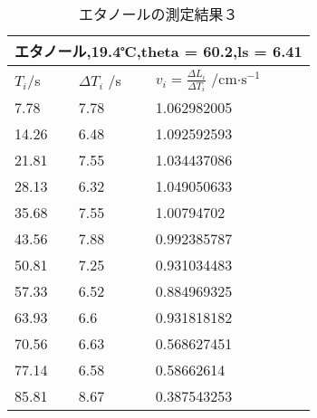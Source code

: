 \documentclass{jsarticle}
\begin{document}
\begin{table}[H]
\centering
\caption{エタノールの測定結果３}
\label{my-label}
\begin{tabular}{|l|l|l|}
\hline
\multicolumn{3}{|l|}{エタノール,19.4℃,theta = 60.2,ls = 6.41} \\ \hline
$T_i $/s   & $\Delta T_i $ /s  & $v_i = \frac{\Delta L_i}{\Delta T_i}$ /cm$\cdot \textrm{s}^{-1}$   \\ \hline
7.78            & 7.78           & 1.062982005           \\ \hline
14.26           & 6.48           & 1.092592593           \\ \hline
21.81           & 7.55           & 1.034437086           \\ \hline
28.13           & 6.32           & 1.049050633           \\ \hline
35.68           & 7.55           & 1.00794702            \\ \hline
43.56           & 7.88           & 0.992385787           \\ \hline
50.81           & 7.25           & 0.931034483           \\ \hline
57.33           & 6.52           & 0.884969325           \\ \hline
63.93           & 6.6            & 0.931818182           \\ \hline
70.56           & 6.63           & 0.568627451           \\ \hline
77.14           & 6.58           & 0.58662614            \\ \hline
85.81           & 8.67           & 0.387543253           \\ \hline
\end{tabular}
\end{table}
\end{document}
